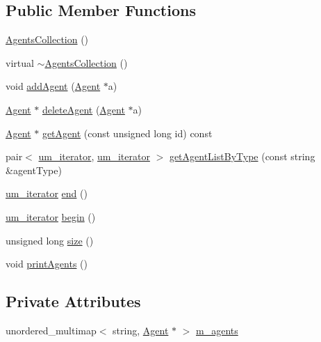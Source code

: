 \subsection*{Public Member Functions}
\begin{DoxyCompactItemize}
\item 
\hyperlink{class_agents_collection_a866b0ed56c0109e82bc7c839de0a3267}{Agents\+Collection} ()
\item 
virtual \hyperlink{class_agents_collection_a8a58eb1f8a45cc4d1c0e04dd912dbae0}{$\sim$\+Agents\+Collection} ()
\item 
void \hyperlink{class_agents_collection_a51d14d0635dedd5971ea90dec4f9e7f3}{add\+Agent} (\hyperlink{class_agent}{Agent} $\ast$a)
\item 
\hyperlink{class_agent}{Agent} $\ast$ \hyperlink{class_agents_collection_afd4d2e005b5e449637abd0fa022132a9}{delete\+Agent} (\hyperlink{class_agent}{Agent} $\ast$a)
\item 
\hyperlink{class_agent}{Agent} $\ast$ \hyperlink{class_agents_collection_a4b6b57c50d715edb3404520cfdb32688}{get\+Agent} (const unsigned long id) const
\item 
pair$<$ \hyperlink{_agents_collection_8h_afde47bc45d604b8b8c72755072376679}{um\+\_\+iterator}, \hyperlink{_agents_collection_8h_afde47bc45d604b8b8c72755072376679}{um\+\_\+iterator} $>$ \hyperlink{class_agents_collection_a4ab0c8e86e6f6ebceb12bd2bd8f9f758}{get\+Agent\+List\+By\+Type} (const string \&agent\+Type)
\item 
\hyperlink{_agents_collection_8h_afde47bc45d604b8b8c72755072376679}{um\+\_\+iterator} \hyperlink{class_agents_collection_afc61b751cf3387ab4a1bf0dfbc29cb82}{end} ()
\item 
\hyperlink{_agents_collection_8h_afde47bc45d604b8b8c72755072376679}{um\+\_\+iterator} \hyperlink{class_agents_collection_abc1d6593a3ed1c1c7b2d31b7efec8db8}{begin} ()
\item 
unsigned long \hyperlink{class_agents_collection_a3226f7eb58b11623bdb353d8938f60d3}{size} ()
\item 
void \hyperlink{class_agents_collection_a193faf9793030715e8edeb65137156e9}{print\+Agents} ()
\end{DoxyCompactItemize}
\subsection*{Private Attributes}
\begin{DoxyCompactItemize}
\item 
unordered\+\_\+multimap$<$ string, \hyperlink{class_agent}{Agent} $\ast$ $>$ \hyperlink{class_agents_collection_a35a5728b0e0108c2f37897720c904dd1}{m\+\_\+agents}
\end{DoxyCompactItemize}


